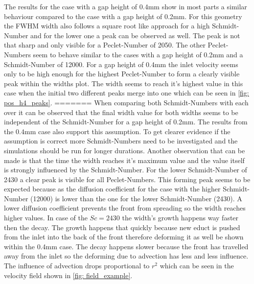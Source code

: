 \documentclass[../thesis.tex]{subfiles}
\begin{document}
The results for the case with a gap height of 0.4mm show in most parts a similar behaviour compared to the case with a gap height of 0.2mm. For this geometry the FWHM width also follows a square root like approach for a high Schmidt-Number and for the lower one a peak can be observed as well. The peak is not that sharp and only visible for a Peclet-Number of 2050. The other Peclet-Numbers seem to behave similar to the cases with a gap height of 0.2mm and a Schmidt-Number of 12000. For a gap height of 0.4mm the inlet velocity seems only to be high enough for the highest Peclet-Number to form a clearly visible peak within the widths plot. The width seems to reach it's highest value in this case when the initial two different peaks merge into one which can be seen in \autoref{fig: pos_h4_peaks}.
=======
When comparing both Schmidt-Numbers with each over it can be observed that the final width value for both widths seems to be independent of the Schmidt-Number for a gap height of 0.2mm. The results from the 0.4mm case also support this assumption. To get clearer evidence if the assumption is correct more Schmidt-Numbers need to be investigated and the simulations should be run for longer durations.
Another observation that can be made is that the time the width reaches it's maximum value and the value itself is strongly influenced by the Schmidt-Number. For the lower Schmidt-Number of 2430 a clear peak is visible for all Peclet-Numbers. This forming peak seems to be expected because as the diffusion coefficient for the case with the higher Schmidt-Number (12000) is lower than the one for the lower Schmidt-Number (2430). A lower diffusion coefficient prevents the front from spreading so the width reaches higher values. In case of the $Sc = 2430$ the width's growth happens way faster then the decay. The growth happens that quickly because new educt is pushed from the inlet into the back of the front therefore deforming it as well be shown within the 0.4mm case. The decay happens slower because the front has travelled away from the inlet so the deforming due to advection has less and less influence. The influence of advection drops proportional to $r^2$ which can be seen in the velocity field shown in \autoref{fig: field_example}. 
\end{document}
